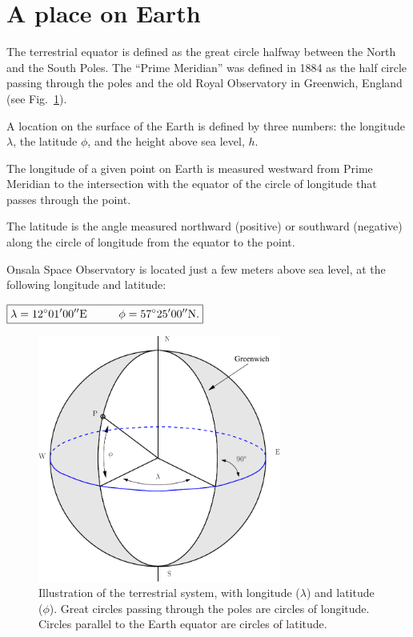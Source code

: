 \section{A place on Earth}

The terrestrial equator is defined as the great circle halfway between
the North and the South Poles.  The ``Prime Meridian'' was defined in
1884 as the half circle passing through the poles and the old Royal
Observatory in Greenwich, England (see Fig.~\ref{figearth}).

A location on the surface of the Earth is defined by three numbers:
the longitude $\lambda$, the latitude $\phi$, and the height above sea
level, $h$.

The longitude of a given point on Earth is measured westward from
Prime Meridian to the intersection with the equator of the circle of
longitude that passes through the point.

The latitude is the angle measured northward (positive) or southward
(negative) along the circle of longitude from the equator to the
point.

Onsala Space Observatory is located just a few meters above sea level,
at the following longitude and latitude:

\begin{center}
${\bf{\boxed{\lambda=12^{\circ}01'00'' \text{E}
\hspace{1cm}\phi=57^{\circ}25'00''\text{N.} }}}$
\end{center}  

\begin{figure}[ht]
\begin{center}
\includegraphics[width=8cm]{../figures/longlat.pdf}
\end{center}
\caption{Illustration of the terrestrial system, with longitude
  ($\lambda$) and latitude ($\phi$).  Great circles passing through
  the poles are circles of longitude.  Circles parallel to the Earth
  equator are circles of latitude. }
\label{figearth}
\end{figure}


